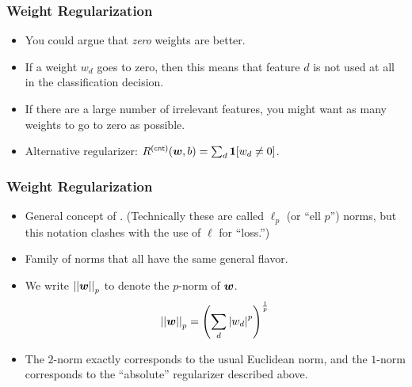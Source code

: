 \documentclass[trans]{beamer}
\begin{document}
\begin{frame}
  \frametitle{Weight Regularization}
\begin{itemize}
\item
You could argue that
\emph{zero} weights are better.  
\item If a weight $w_d$ goes to zero, then
this means that feature $d$ is not used at all in the classification
decision.
\item   If there are a large number of irrelevant features, you
might want as many weights to go to zero as possible.  
\item Alternative regularizer: $R\xth{cnt}(\vw,b) = \sum_d \Ind[w_d \neq
0]$.
\end{itemize}
\end{frame}

\begin{frame}
  \frametitle{Weight Regularization}
\begin{itemize}
\item
General concept of
.  (Technically these are called $\ell_p$ (or ``ell
$p$'') norms, but this notation clashes with the use of $\ell$ for
``loss.'') 
\item Family of norms that all have the same general
flavor. 
\item We write $\left\vert\left\vert {\boldsymbol{w}} \right\vert\right\vert_p$ to denote the $p$-norm of ${\boldsymbol{w}}$.
%
\begin{equation} \label{eq:loss:l}
  \left\vert\left\vert {\boldsymbol{w}} \right\vert\right\vert_p = \left( \sum_d \left\vert w_d \right\vert^p \right)^{\frac 1 p}
\end{equation}
%
\item The $2$-norm exactly corresponds to the usual
Euclidean norm, and  the $1$-norm corresponds to the ``absolute''
regularizer described above.
\end{itemize}
\end{frame}
\end{document}
